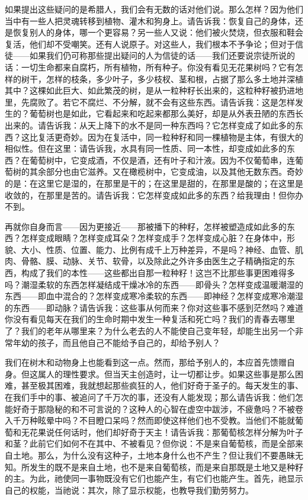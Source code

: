 如果提出这些疑问的是希腊人，我们会有无数的话对他们说。那么怎样？因为他们当中有一些人把灵魂转移到植物、灌木和狗身上。请告诉我：恢复自己的身体，还是恢复别人的身体，哪一个更容易？另一些人又说：他们被火焚烧，但衣服和鞋会复活，他们却不受嘲笑。还有人说原子。对这些人，我们根本不予争论；但对于信徒——如果我们仍可称那些提出疑问的人为信徒的话——我们还要说宗徒所说的话：一切生命都来自腐朽，所有植物，所有种子。你没有看见无花果树吗？它有怎样的树干，怎样的枝条，多少叶子，多少枝杈、茎和根，占据了那么多土地并深植其中？这棵如此巨大、如此繁茂的树，是从一粒种籽长出来的，这粒种籽被扔进地里，先腐败了。若它不腐烂、不分解，就不会有这些东西。请告诉我：这是怎样发生的？葡萄树也是如此，它看起来和吃起来都那么美好，却是从外表丑陋的东西长出来的。请告诉我：从天上降下的水不是同一种东西吗？它怎样变成了如此多的东西？这比复活更奇妙。因为在复活中，同一粒种籽和同一棵植物是主体，有很大的相似性。但在这里：请告诉我，水具有同一性质、同一本性，却变成如此多的东西？在葡萄树中，它变成酒，不仅是酒，还有叶子和汁液。因为不仅葡萄串，连葡萄树的其余部分也由它滋养。又在橄榄树中，它变成油，以及其他无数东西。奇妙的是：在这里它是湿的，在那里是干的；在这里是甜的，在那里是酸的；在这里是收敛的，在那里是苦的。请告诉我：它怎样变成如此多的东西？给我理由！但你办不到。\par

再就你自身而言——因为更接近——那被播下的种籽，怎样被塑造成如此多的东西？怎样变成眼睛？怎样变成耳朵？怎样变成手？怎样变成心脏？在身体中，形貌、大小、性质、位置、能力、比例有成千上万种差异，不是吗？神经、血管、肌肉、骨骼、膜、动脉、关节、软骨，以及除此之外许多由医生之子精确指定的东西，构成了我们的本性——这些都出自那一粒种籽！这岂不比那些事更困难得多吗？潮湿柔软的东西怎样凝结成干燥冰冷的东西——即骨头？怎样变成温暖潮湿的东西——即血中混合的？怎样变成寒冷柔软的东西——即神经？怎样变成寒冷潮湿的东西——即动脉？请告诉我：这些事从何而来？你对这些事不感到茫然吗？难道你没有看见每天在我们的生命时期中发生一种复活和死亡吗？我们的青春去哪里了？我们的老年从哪里来？为什么老去的人不能使自己变年轻，却能生出另一个非常年幼的孩子，而且他自己不能给予自己的，却给予别人？\par

我们在树木和动物身上也能看到这一点。然而，那给予别人的，本应首先馈赠自身。但这属人的理性要求。但当天主创造时，让一切都让步。如果这些事是那么困难，甚至极其困难，我就想起那些疯狂的人，他们好奇于圣子的。每天发生的事、在我们手中的事、被追问了千万次的事，还没有人能发现；那么请告诉我：他们怎能好奇于那隐秘的和不可言说的？这种人的心智在虚空中跋涉，不疲惫吗？不被卷入千万种眩晕中吗？不目瞪口呆吗？然而即使这样他们也不受教。当他们不能就葡萄和无花果说任何话时，他们却好奇于天主！请告诉我：那葡萄核怎样分解为叶子和茎？此前它们如何不在其中、不被看见？但你说：不是来自葡萄核，而是全部来自土地。那么，为什么没有这种子，土地本身什么也不产生？但让我们不要愚昧无知。所发生的既不是来自土地，也不是来自葡萄核，而是来自那既是土地又是种籽的主。为此，祂使同一事物既没有它们也能产生，有它们也能产生。首先，祂显示自己的权能，当祂说：\newline{}其次，除了显示权能，也教导我们勤劳努力。\par

